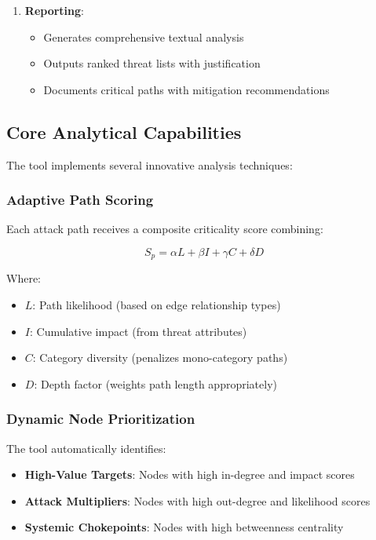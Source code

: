 \documentclass[binding=0.6cm]{sapthesis}
\begin{document}
\begin{enumerate}
\item \textbf{Reporting}:
\begin{itemize}
    \item Generates comprehensive textual analysis
    \item Outputs ranked threat lists with justification
    \item Documents critical paths with mitigation recommendations
\end{itemize}
\end{enumerate}

\subsection{Core Analytical Capabilities}

The tool implements several innovative analysis techniques:

\subsubsection{Adaptive Path Scoring}

Each attack path receives a composite criticality score combining:

\begin{equation}
S_p = \alpha L + \beta I + \gamma C + \delta D
\end{equation}

Where:
\begin{itemize}
\item $L$: Path likelihood (based on edge relationship types)
\item $I$: Cumulative impact (from threat attributes)
\item $C$: Category diversity (penalizes mono-category paths)
\item $D$: Depth factor (weights path length appropriately)
\end{itemize}

\subsubsection{Dynamic Node Prioritization}

The tool automatically identifies:

\begin{itemize}
\item \textbf{High-Value Targets}: Nodes with high in-degree and impact scores
\item \textbf{Attack Multipliers}: Nodes with high out-degree and likelihood scores
\item \textbf{Systemic Chokepoints}: Nodes with high betweenness centrality
\end{itemize}
\end{document}
